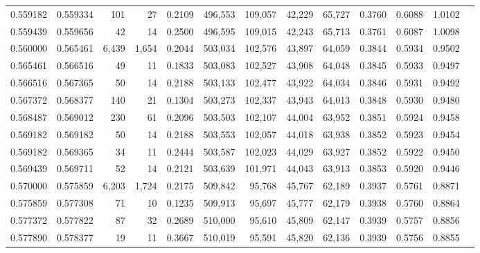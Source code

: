 \begin{tabular}{rrrrrrrrrrrrr}
0.559182 & 0.559334 &    101 &    27 &                                     0.2109 & 496,553 & 109,057 &  42,229 &  65,727 & 0.3760 & 0.6088 & 1.0102 \\
0.559439 & 0.559656 &     42 &    14 &                                     0.2500 & 496,595 & 109,015 &  42,243 &  65,713 & 0.3761 & 0.6087 & 1.0098 \\
0.560000 & 0.565461 &  6,439 & 1,654 &                                     0.2044 & 503,034 & 102,576 &  43,897 &  64,059 & 0.3844 & 0.5934 & 0.9502 \\
0.565461 & 0.566516 &     49 &    11 &                                     0.1833 & 503,083 & 102,527 &  43,908 &  64,048 & 0.3845 & 0.5933 & 0.9497 \\
0.566516 & 0.567365 &     50 &    14 &                                     0.2188 & 503,133 & 102,477 &  43,922 &  64,034 & 0.3846 & 0.5931 & 0.9492 \\
0.567372 & 0.568377 &    140 &    21 &                                     0.1304 & 503,273 & 102,337 &  43,943 &  64,013 & 0.3848 & 0.5930 & 0.9480 \\
0.568487 & 0.569012 &    230 &    61 &                                     0.2096 & 503,503 & 102,107 &  44,004 &  63,952 & 0.3851 & 0.5924 & 0.9458 \\
0.569182 & 0.569182 &     50 &    14 &                                     0.2188 & 503,553 & 102,057 &  44,018 &  63,938 & 0.3852 & 0.5923 & 0.9454 \\
0.569182 & 0.569365 &     34 &    11 &                                     0.2444 & 503,587 & 102,023 &  44,029 &  63,927 & 0.3852 & 0.5922 & 0.9450 \\
0.569439 & 0.569711 &     52 &    14 &                                     0.2121 & 503,639 & 101,971 &  44,043 &  63,913 & 0.3853 & 0.5920 & 0.9446 \\
0.570000 & 0.575859 &  6,203 & 1,724 &                                     0.2175 & 509,842 &  95,768 &  45,767 &  62,189 & 0.3937 & 0.5761 & 0.8871 \\
0.575859 & 0.577308 &     71 &    10 &                                     0.1235 & 509,913 &  95,697 &  45,777 &  62,179 & 0.3938 & 0.5760 & 0.8864 \\
0.577372 & 0.577822 &     87 &    32 &                                     0.2689 & 510,000 &  95,610 &  45,809 &  62,147 & 0.3939 & 0.5757 & 0.8856 \\
0.577890 & 0.578377 &     19 &    11 &                                     0.3667 & 510,019 &  95,591 &  45,820 &  62,136 & 0.3939 & 0.5756 & 0.8855 \\

\end{tabular}
